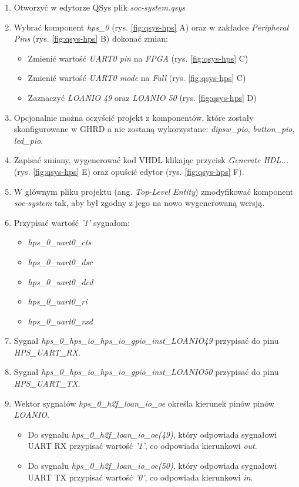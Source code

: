 \begin{enumerate}
\item Otworzyć w edytorze QSys plik \textit{soc-system.qsys}
\item Wybrać komponent \textit{hps\_0} (rys. \ref{fig:qsys-hps} A) oraz w zakładce \textit{Peripheral Pins} (rys. \ref{fig:qsys-hps} B) dokonać zmian:
	\begin{itemize}[noitemsep,nolistsep]
	\item Zmienić wartość \textit{UART0 pin} na \textit{FPGA} (rys. \ref{fig:qsys-hps} C)
	\item Zmienić wartość \textit{UART0 mode} na \textit{Full} (rys. \ref{fig:qsys-hps} C)
	\item Zaznaczyć \textit{LOANIO 49} oraz \textit{LOANIO 50} (rys. \ref{fig:qsys-hps} D)
	\end{itemize}
\item Opcjonalnie można oczyścić projekt z komponentów, które zostały skonfigurowane w GHRD a nie zostaną wykorzystane: \textit{dipsw\_pio}, \textit{button\_pio}, \textit{led\_pio}.
\item Zapisać zmiany, wygenerować kod VHDL klikając przycisk \textit{Generate HDL...} (rys. \ref{fig:qsys-hps} E) oraz opuścić edytor (rys. \ref{fig:qsys-hps} F).
\item W głównym pliku projektu (ang. \textit{Top-Level Entity}) zmodyfikować komponent \textit{soc-system} tak, aby był zgodny z jego na nowo wygenerowaną wersją.
\item Przypisać wartość \textit{'1'} sygnałom:
	\begin{itemize}[noitemsep,nolistsep]
	\item \textit{hps\_0\_uart0\_cts}
	\item \textit{hps\_0\_uart0\_dsr}
	\item \textit{hps\_0\_uart0\_dcd}
	\item \textit{hps\_0\_uart0\_ri}
	\item \textit{hps\_0\_uart0\_rxd}
	\end{itemize}
\item Sygnał \textit{hps\_0\_hps\_io\_hps\_io\_gpio\_inst\_LOANIO49} przypisać do pinu \textit{HPS\_UART\_RX}.
\item Sygnał \textit{hps\_0\_hps\_io\_hps\_io\_gpio\_inst\_LOANIO50} przypisać do pinu \textit{HPS\_UART\_TX}.
\item Wektor sygnałów \textit{hps\_0\_h2f\_loan\_io\_oe} określa kierunek pinów pinów \textit{LOANIO}.
	\begin{itemize}[noitemsep,nolistsep]
	\item Do sygnału \textit{hps\_0\_h2f\_loan\_io\_oe(49)}, który odpowiada sygnałowi UART RX przypisać wartość \textit{'1'}, co odpowiada kierunkowi \textit{out}.
	\item Do sygnału \textit{hps\_0\_h2f\_loan\_io\_oe(50)}, który odpowiada sygnałowi UART TX przypisać wartość \textit{'0'}, co odpowiada kierunkowi \textit{in}.
	\end{itemize}
\end{enumerate}

